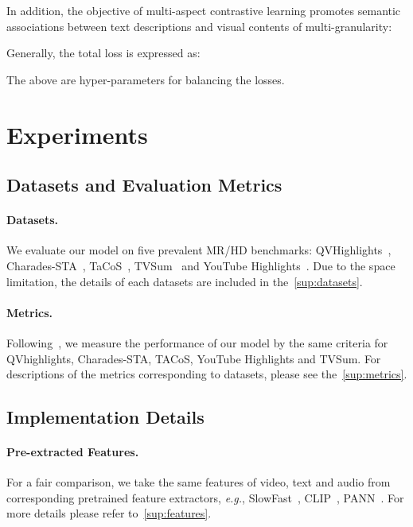 \documentclass[10pt,twocolumn,letterpaper]{article}
\begin{document}
\noindent In addition, the objective of multi-aspect contrastive learning promotes semantic associations between text descriptions and visual contents of multi-granularity:

Generally, the total loss is expressed as:

The  above are hyper-parameters for balancing the losses. \section{Experiments}

\subsection{Datasets and Evaluation Metrics}
\paragraph{Datasets.} We evaluate our model on five prevalent MR/HD benchmarks: QVHighlights~\cite{momentdetr}, Charades-STA~\cite{cha}, TaCoS~\cite{tacos}, TVSum~\cite{tvsum} and YouTube Highlights~\cite{youtubehl}. Due to the space limitation, the details of each datasets are included in the~\cref{sup:datasets}.


\vspace{-7pt}
\paragraph{Metrics.} 
Following~\cite{momentdetr,umt,detr}, we measure the performance of our model by the same criteria for QVhighlights, Charades-STA, TACoS, YouTube Highlights and TVSum. For descriptions of the metrics corresponding to datasets, please see the~\cref{sup:metrics}.


\subsection{Implementation Details}
\paragraph{Pre-extracted Features.} For a fair comparison, we take the same features of video, text and audio from corresponding pretrained feature extractors, \textit{e.g.}, SlowFast~\cite{slowfast}, CLIP~\cite{clip}, PANN~\cite{pann}. For more details please refer to~\cref{sup:features}.
\end{document}

